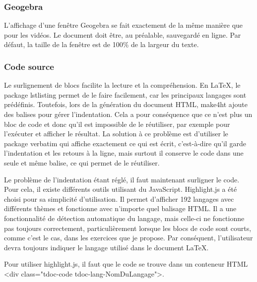 \documentclass[12pt,titlepage,oneside]{article}
\renewcommand{\footnote}[1]{}
\begin{document}
\subsubsection{Geogebra}
L'affichage d'une fenêtre Geogebra\footnote{\url{https://www.geogebra.org/}} se fait exactement de la même manière que pour les vidéos. Le document doit être, au préalable, sauvegardé en ligne. Par défaut, la taille de la fenêtre est de 100\% de la largeur du texte.

\subsubsection{Code source}
Le surlignement de blocs facilite la lecture et la compréhension. En LaTeX, le package lstlisting permet de le faire facilement, car les principaux langages sont prédéfinis. Toutefois, lors de la génération du document HTML, make4ht ajoute des balises pour gérer l'indentation. Cela a pour conséquence que ce n'est plus un bloc de code et donc qu'il est impossible de le réutiliser, par exemple pour l'exécuter et afficher le résultat. La solution à ce problème est d'utiliser le package verbatim qui affiche exactement ce qui est écrit, c'est-à-dire qu'il garde l'indentation et les retours à la ligne, mais surtout il conserve le code dans une seule et même balise, ce qui permet de le réutiliser.\par
Le problème de l'indentation étant réglé, il faut maintenant surligner le code. Pour cela, il existe différents outils utilisant du JavaScript. Highlight.js\footnote{\url{https://highlightjs.org/}} a été choisi pour sa simplicité d'utilisation. Il permet d'afficher 192 langages avec différents thèmes et fonctionne avec n'importe quel balisage HTML. Il a une fonctionnalité de détection automatique du langage, mais celle-ci ne fonctionne pas toujours correctement, particulièrement lorsque les blocs de code sont courts, comme c'est le cas, dans les exercices que je propose. Par conséquent, l'utilisateur devra toujours indiquer le langage utilisé dans le document LaTeX.\par
Pour utiliser highlight.js, il faut que le code se trouve dans un conteneur HTML <div class="tdoc-code tdoc-lang-NomDuLangage">.\par
\end{document}

